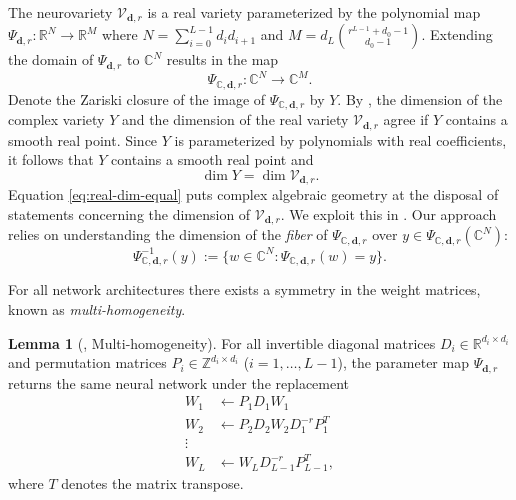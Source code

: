 \documentclass[12pt]{article}
\theoremstyle{definition}
\newtheorem{lemma}[theorem]{Lemma}
\newcommand{\bfd}{\mathbf{d}}
\newcommand{\edimRHS}{d_L\binom{r^{L-1}+d_0-1}{d_0-1}}
\newcommand{\demph}[1]{\emph{{\color{RoyalBlue}#1}}}
\newcommand{\complexPsiMap}{\Psi_{{\mathbb{C},\mathbf{d},r}}}
\renewcommand{\dim}[1]{\operatorname{dim}{#1}}
\begin{document}
The neurovariety $\mathcal{V}_{\bfd,r}$  is a real variety parameterized by the polynomial map 
$\Psi_{\mathbf{d},r}:\mathbb{R}^{N}\to\mathbb{R}^M$
where $N=\sum_{i=0}^{L-1}d_id_{i+1}$ and $M=\edimRHS$. 
Extending the domain of $\Psi_{\mathbf{d},r}$ to $\mathbb{C}^N$
results in the map  
\begin{equation}\label{eq:cc-psi}
\complexPsiMap:\mathbb{C}^N\to\mathbb{C}^M.
\end{equation}
Denote the Zariski closure of the image of $\complexPsiMap$ by $Y$. 
By \cite[Theorem 12.2]{Sottile-Real-AG-Handbook}, 
the dimension of the complex variety $Y$ and the dimension of the real variety $\mathcal{V}_{\bfd,r}$ agree if $Y$ contains a smooth real point. 
Since $Y$ is parameterized by polynomials with real coefficients, it follows that $Y$ contains a smooth real point and 
%
\begin{equation}\label{eq:real-dim-equal}
    \dim{Y} 
    =
    \dim{\mathcal{V}_{\bfd,r}}.
\end{equation}
Equation \eqref{eq:real-dim-equal} puts complex algebraic geometry at the disposal of statements concerning the dimension of $\mathcal{V}_{\bfd,r}$. We exploit this in . 
Our approach relies on 
understanding the dimension of the \demph{fiber} of $\complexPsiMap$ over 
$y\in \complexPsiMap(\mathbb{C}^N)$: 
\[\complexPsiMap^{-1}(y):=\{ w\in \mathbb{C}^N: \complexPsiMap(w)=y\}.\] 

For all network architectures there exists a symmetry in the weight matrices, known as \demph{multi-homogeneity}.

\begin{lemma}[\cite{KTB2019}, Multi-homogeneity]\label{lem:multi-hom}
    For all invertible diagonal matrices $D_i\in\mathbb{R}^{d_i\times d_i}$ and permutation matrices $P_i\in\mathbb{Z}^{d_i\times d_i}$ ($i=1,\dots,L-1$), the parameter map $\Psi_{\mathbf{d},r}$ returns the same neural network under the replacement
    \begin{align*}
        W_1&\leftarrow P_1D_1W_1\\
        W_2&\leftarrow P_2D_2W_2D_1^{-r}P_1^T\\
        \vdots\\
        W_L&\leftarrow W_L D_{L-1}^{-r} P_{L-1}^T,
    \end{align*}
    where $T$ denotes the matrix transpose. 
\end{lemma}
\end{document}

